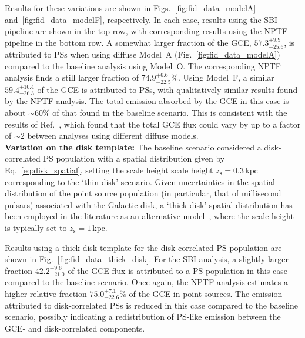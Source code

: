 \documentclass[prd,aps,10pt,nofootinbib,twocolumn,superscriptaddress,preprintnumbers,balancelastpage,longbibliography,floatfix]{revtex4-2}
\begin{document}
Results for these variations are shown in Figs.~\ref{fig:fid_data_modelA} and~\ref{fig:fid_data_modelF}, respectively. In each case, results using the SBI pipeline are shown in the top row, with corresponding results using the NPTF pipeline in the bottom row. 
A somewhat larger fraction of the GCE, $57.3^{+9.9}_{-25.6}$, is attributed to PSs when using diffuse {Model~A} (Fig.~\ref{fig:fid_data_modelA}) compared to the baseline analysis using {Model~O}. The corresponding NPTF analysis finds a still larger fraction of $74.9^{+6.6}_{-22.5}\%$. Using {Model~F}, a similar $59.4^{+10.4}_{-26.3}$ of the GCE is attributed to PSs, with qualitatively similar results found by the NPTF analysis. The total emission absorbed by the GCE in this case is about $\sim 60\%$ of that found in the baseline scenario. This is consistent with the results of Ref.~\cite{Buschmann:2020adf}, which found that the total GCE flux could vary by up to a factor of $\sim 2$ between analyses using different diffuse models. \\

\noindent
\textbf{Variation on the disk template:}
The baseline scenario considered a disk-correlated PS population with a spatial distribution given by Eq.~\eqref{eq:disk_spatial}, setting the scale height scale height $z_\mathrm{s} = 0.3\,\mathrm{kpc}$ corresponding to the `thin-disk' scenario. Given uncertainties in the spatial distribution of the point source population (in particular, that of millisecond pulsars) associated with the Galactic disk, a `thick-disk' spatial distribution has been employed in the literature as an alternative model~\cite{Lee:2015fea,Leane:2019xiy,Buschmann:2020adf}, where the scale height is typically set to $z_\mathrm{s} = 1\,\mathrm{kpc}$. 

Results using a thick-disk template for the disk-correlated PS population are shown in Fig.~\ref{fig:fid_data_thick_disk}. For the SBI analysis, a slightly larger fraction $42.2^{+9.6}_{-21.0}$ of the GCE flux is attributed to a PS population in this case compared to the baseline scenario. Once again, the NPTF analysis estimates a higher relative fraction $75.0^{+7.1}_{-22.6}\%$ of the GCE in point sources. The emission attributed to disk-correlated PSs is reduced in this case compared to the baseline scenario, possibly indicating a redistribution of PS-like emission between the GCE- and disk-correlated components. \\
\end{document}
